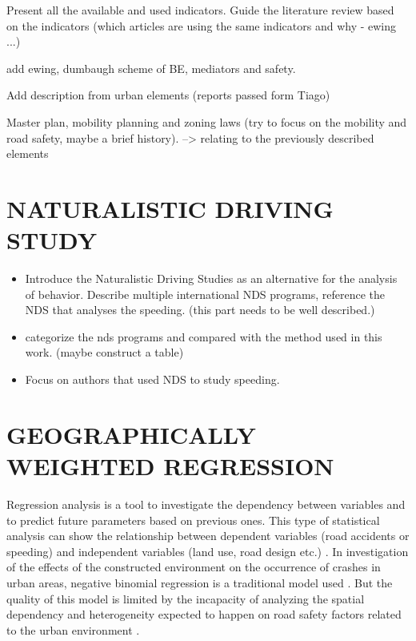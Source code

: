 






Present all the available and used indicators. Guide the literature review based on the indicators (which articles are using the same indicators and why - ewing ...)

add ewing, dumbaugh scheme of BE, mediators and safety.

Add description from urban elements (reports passed form Tiago)

Master plan, mobility planning and zoning laws (try to focus on the mobility and road safety, maybe a brief history). --> relating to the previously described elements

\section{NATURALISTIC DRIVING STUDY} \label{nds}

\begin{itemize}
    \item Introduce the Naturalistic Driving Studies as an alternative for the analysis of behavior. Describe multiple international NDS programs, reference the NDS that analyses the speeding. (this part needs to be well described.)
    \item categorize the nds programs and compared with the method used in this work. (maybe construct a table)
    \item Focus on authors that used NDS to study speeding. 
\end{itemize}

\section{GEOGRAPHICALLY WEIGHTED REGRESSION}

Regression analysis is a tool to investigate the dependency between variables and to predict future parameters based on previous ones. This type of statistical analysis can show the relationship between dependent variables (road accidents or speeding) and independent variables (land use, road design etc.) \cite{Lindley1987}. In investigation of the effects of the constructed environment on the occurrence of crashes in urban areas, negative binomial regression is a traditional model used \cite{Wei2013, Zhang2014}. But the quality of this model is limited by the incapacity of analyzing the spatial dependency and heterogeneity expected to happen on road safety factors related to the urban environment \cite{Obelheiro2019}.


